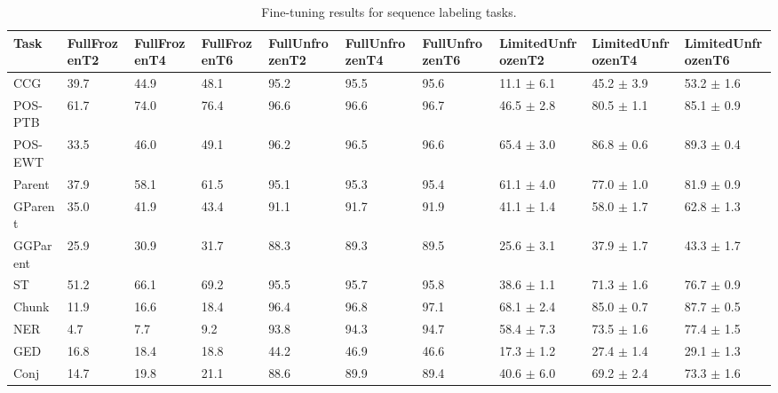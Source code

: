 \begin{table*}[t]
\centering
\begin{adjustbox}{max width=\textwidth}
  \begin{tabular}{ l  l l l | l l l | l l l}
\toprule
\textbf{Task} & FullFrozenT2 & FullFrozenT4 & FullFrozenT6 & FullUnfrozenT2 & FullUnfrozenT4 & FullUnfrozenT6 & LimitedUnfrozenT2 & LimitedUnfrozenT4 & LimitedUnfrozenT6 \\
\midrule
CCG & 39.7 & 44.9 & 48.1 & 95.2 & 95.5 & 95.6 & 11.1 $\pm$ 6.1 & 45.2 $\pm$ 3.9 & 53.2 $\pm$ 1.6\\
POS-PTB & 61.7 & 74.0 & 76.4 & 96.6 & 96.6 & 96.7 & 46.5 $\pm$ 2.8 & 80.5 $\pm$ 1.1 & 85.1 $\pm$ 0.9\\
POS-EWT & 33.5 & 46.0 & 49.1 & 96.2 & 96.5 & 96.6 & 65.4 $\pm$ 3.0 & 86.8 $\pm$ 0.6 & 89.3 $\pm$ 0.4\\
Parent & 37.9 & 58.1 & 61.5 & 95.1 & 95.3 & 95.4 & 61.1 $\pm$ 4.0 & 77.0 $\pm$ 1.0 & 81.9 $\pm$ 0.9\\
GParent & 35.0 & 41.9 & 43.4 & 91.1 & 91.7 & 91.9 & 41.1 $\pm$ 1.4 & 58.0 $\pm$ 1.7 & 62.8 $\pm$ 1.3\\
GGParent & 25.9 & 30.9 & 31.7 & 88.3 & 89.3 & 89.5 & 25.6 $\pm$ 3.1 & 37.9 $\pm$ 1.7 & 43.3 $\pm$ 1.7\\
ST & 51.2 & 66.1 & 69.2 & 95.5 & 95.7 & 95.8 & 38.6 $\pm$ 1.1 & 71.3 $\pm$ 1.6 & 76.7 $\pm$ 0.9\\
Chunk & 11.9 & 16.6 & 18.4 & 96.4 & 96.8 & 97.1 & 68.1 $\pm$ 2.4 & 85.0 $\pm$ 0.7 & 87.7 $\pm$ 0.5\\
NER & 4.7 & 7.7 & 9.2 & 93.8 & 94.3 & 94.7 & 58.4 $\pm$ 7.3 & 73.5 $\pm$ 1.6 & 77.4 $\pm$ 1.5\\
GED & 16.8 & 18.4 & 18.8 & 44.2 & 46.9 & 46.6 & 17.3 $\pm$ 1.2 & 27.4 $\pm$ 1.4 & 29.1 $\pm$ 1.3\\
Conj & 14.7 & 19.8 & 21.1 & 88.6 & 89.9 & 89.4 & 40.6 $\pm$ 6.0 & 69.2 $\pm$ 2.4 & 73.3 $\pm$ 1.6\\
\bottomrule
 \end{tabular}
 \end{adjustbox}
  \caption{Fine-tuning results for sequence labeling tasks.}
  \label{tbla3}
\end{table*}
